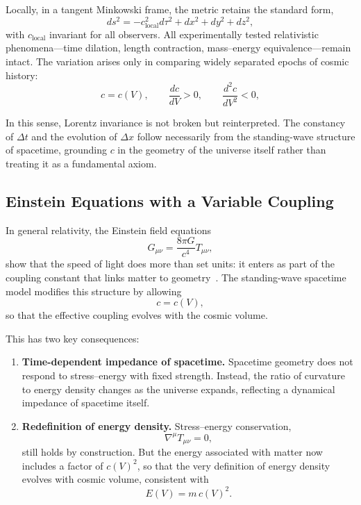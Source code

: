 \documentclass[12pt]{article}
\begin{document}
Locally, in a tangent Minkowski frame, the metric retains the standard form,
\begin{equation}
ds^2 = -c_{\text{local}}^2 d\tau^2 + dx^2 + dy^2 + dz^2,
\end{equation}
with $c_{\text{local}}$ invariant for all observers. All experimentally tested relativistic phenomena---time dilation, length contraction, mass–energy equivalence---remain intact. The variation arises only in comparing widely separated epochs of cosmic history:
\begin{equation}
  c = c(V), \qquad \frac{dc}{dV} > 0, \qquad \frac{d^2c}{dV^2} < 0,
\end{equation}

In this sense, Lorentz invariance is not broken but reinterpreted. The constancy of $\Delta t$ and the evolution of $\Delta x$ follow necessarily from the standing-wave structure of spacetime, grounding $c$ in the geometry of the universe itself rather than treating it as a fundamental axiom.

\subsection{Einstein Equations with a Variable Coupling}

In general relativity, the Einstein field equations~\cite{misner1973}  
\begin{equation}
  G_{\mu\nu} = \frac{8\pi G}{c^4} T_{\mu\nu},
\end{equation}
show that the speed of light does more than set units: it enters as part of the coupling constant that links matter to geometry~\cite{albrecht1999}. The standing-wave spacetime model modifies this structure by allowing
\begin{equation}
  c = c(V),
\end{equation}
so that the effective coupling evolves with the cosmic volume.

This has two key consequences:

\begin{enumerate}
  \item \textbf{Time-dependent impedance of spacetime.} Spacetime geometry does not respond to stress–energy with fixed strength. Instead, the ratio of curvature to energy density changes as the universe expands, reflecting a dynamical impedance of spacetime itself.
  \item \textbf{Redefinition of energy density.} Stress–energy conservation,
  \begin{equation}
    \nabla^\mu T_{\mu\nu} = 0,
  \end{equation}
  still holds by construction. But the energy associated with matter now includes a factor of $c(V)^2$, so that the very definition of energy density evolves with cosmic volume, consistent with
  \begin{equation}
    E(V) = m\,c(V)^2.
  \end{equation}
\end{enumerate}
\end{document}
